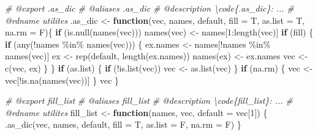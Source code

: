 \documentclass[
]{article}
\newenvironment{Shaded}{\begin{snugshade}}{\end{snugshade}}
\newcommand{\AttributeTok}[1]{\textcolor[rgb]{0.77,0.63,0.00}{#1}}
\newcommand{\CommentTok}[1]{\textcolor[rgb]{0.56,0.35,0.01}{\textit{#1}}}
\newcommand{\ControlFlowTok}[1]{\textcolor[rgb]{0.13,0.29,0.53}{\textbf{#1}}}
\newcommand{\DecValTok}[1]{\textcolor[rgb]{0.00,0.00,0.81}{#1}}
\newcommand{\FunctionTok}[1]{\textcolor[rgb]{0.00,0.00,0.00}{#1}}
\newcommand{\NormalTok}[1]{#1}
\newcommand{\OtherTok}[1]{\textcolor[rgb]{0.56,0.35,0.01}{#1}}
\newcommand{\SpecialCharTok}[1]{\textcolor[rgb]{0.00,0.00,0.00}{#1}}
\begin{document}
\begin{Shaded}
\begin{Highlighting}[]
\CommentTok{\#\textquotesingle{} @export .as\_dic}
\CommentTok{\#\textquotesingle{} @aliases .as\_dic}
\CommentTok{\#\textquotesingle{} @description \textbackslash{}code\{.as\_dic\}: ...}
\CommentTok{\#\textquotesingle{} @rdname utilites}
\NormalTok{.as\_dic }\OtherTok{\textless{}{-}} 
  \ControlFlowTok{function}\NormalTok{(vec, names, default,}
    \AttributeTok{fill =}\NormalTok{ T, }\AttributeTok{as.list =}\NormalTok{ T, }\AttributeTok{na.rm =}\NormalTok{ F)\{}
    \ControlFlowTok{if}\NormalTok{ (}\FunctionTok{is.null}\NormalTok{(}\FunctionTok{names}\NormalTok{(vec)))}
      \FunctionTok{names}\NormalTok{(vec) }\OtherTok{\textless{}{-}}\NormalTok{ names[}\DecValTok{1}\SpecialCharTok{:}\FunctionTok{length}\NormalTok{(vec)]}
    \ControlFlowTok{if}\NormalTok{ (fill) \{}
      \ControlFlowTok{if}\NormalTok{ (}\FunctionTok{any}\NormalTok{(}\SpecialCharTok{!}\NormalTok{names }\SpecialCharTok{\%in\%} \FunctionTok{names}\NormalTok{(vec))) \{}
\NormalTok{        ex.names }\OtherTok{\textless{}{-}}\NormalTok{ names[}\SpecialCharTok{!}\NormalTok{names }\SpecialCharTok{\%in\%} \FunctionTok{names}\NormalTok{(vec)]}
\NormalTok{        ex }\OtherTok{\textless{}{-}} \FunctionTok{rep}\NormalTok{(default, }\FunctionTok{length}\NormalTok{(ex.names))}
        \FunctionTok{names}\NormalTok{(ex) }\OtherTok{\textless{}{-}}\NormalTok{ ex.names}
\NormalTok{        vec }\OtherTok{\textless{}{-}} \FunctionTok{c}\NormalTok{(vec, ex)}
\NormalTok{      \}}
\NormalTok{    \}}
    \ControlFlowTok{if}\NormalTok{ (as.list) \{}
      \ControlFlowTok{if}\NormalTok{ (}\SpecialCharTok{!}\FunctionTok{is.list}\NormalTok{(vec))}
\NormalTok{        vec }\OtherTok{\textless{}{-}} \FunctionTok{as.list}\NormalTok{(vec)}
\NormalTok{    \}}
    \ControlFlowTok{if}\NormalTok{ (na.rm) \{}
\NormalTok{      vec }\OtherTok{\textless{}{-}}\NormalTok{ vec[}\SpecialCharTok{!}\FunctionTok{is.na}\NormalTok{(}\FunctionTok{names}\NormalTok{(vec))]}
\NormalTok{    \}}
\NormalTok{    vec}
\NormalTok{  \}}

\CommentTok{\#\textquotesingle{} @export fill\_list}
\CommentTok{\#\textquotesingle{} @aliases fill\_list}
\CommentTok{\#\textquotesingle{} @description \textbackslash{}code\{fill\_list\}: ...}
\CommentTok{\#\textquotesingle{} @rdname utilites}
\NormalTok{fill\_list }\OtherTok{\textless{}{-}} \ControlFlowTok{function}\NormalTok{(names, vec, }\AttributeTok{default =}\NormalTok{ vec[}\DecValTok{1}\NormalTok{]) \{}
  \FunctionTok{.as\_dic}\NormalTok{(vec, names, default, }\AttributeTok{fill =}\NormalTok{ T, }\AttributeTok{as.list =}\NormalTok{ F, }\AttributeTok{na.rm =}\NormalTok{ F)}
\NormalTok{\}}


\end{Highlighting}
\end{Shaded}
\end{document}
